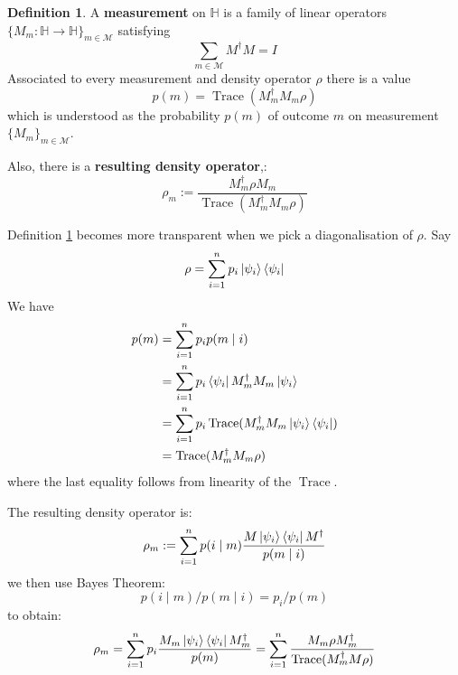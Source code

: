 \documentclass[12pt]{article}
\theoremstyle{plain}
\theoremstyle{definition}
\newtheorem{defn}[thm]{Definition} %
\newcommand{\bb}[1]{\mathbb{#1}}
\newcommand{\call}[1]{\mathcal{#1}}
\newcommand{\lto}{\longrightarrow}
\begin{document}
	\begin{defn}\label{def:density_measurement}
		A \textbf{measurement} on $\bb{H}$ is a family of linear operators $\lbrace M_m: \bb{H} \lto \bb{H}\rbrace_{m \in \call{M}}$ satisfying
		\begin{equation}
			\sum_{m \in \call{M}}M^\dagger M = I
		\end{equation}
		Associated to every measurement and density operator $\rho$ there is a value
		\begin{equation}
			p(m) = \operatorname{Trace}(M^\dagger_mM_m \rho)
		\end{equation}
		which is understood as the probability $p(m)$ of outcome $m$ on measurement $\lbrace M_m\rbrace_{m \in \call{M}}$.
		
		Also, there is a \textbf{resulting density operator},:
		\begin{equation}
			\rho_m := \frac{M_m^\dagger \rho M_m}{\operatorname{Trace}(M^\dagger_mM_m \rho)}
		\end{equation}
	\end{defn}
	Definition \ref{def:density_measurement} becomes more transparent when we pick a diagonalisation of $\rho$. Say
	\begin{equation}
		\rho = \sum_{i = 1}^n p_i \ket{\psi_i}\bra{\psi_i}
		\end{equation}
	We have
	\begin{align*}
		p(m) &= \sum_{i = 1}^n p_i p(m \mid i)\\
		&=\sum_{i = 1}^n p_i \bra{\psi_i}M^\dagger_m M_m \ket{\psi_i}\\
		&= \sum_{i = 1}^n p_i \operatorname{Trace}(M^\dagger_m M_m \ket{\psi_i}\bra{\psi_i})\\
		&= \operatorname{Trace}(M^\dagger_m M_m \rho)
	\end{align*}
	where the last equality follows from linearity of the $\operatorname{Trace}$.
	
	The resulting density operator is:
	\begin{equation}
		\rho_m := \sum_{i = 1}^n p(i\mid m)\frac{M\ket{\psi_i}\bra{\psi_i}M^\dagger}{p(m \mid i)}
	\end{equation}
	we then use Bayes Theorem:
	\begin{equation}
		p(i \mid m)/p(m \mid i) = p_i/p(m)
	\end{equation}
	to obtain:
	\begin{equation}
		\rho_m = \sum_{i = 1}^n p_i\frac{M_m\ket{\psi_i}\bra{\psi_i}M_m^\dagger}{p(m)} = \sum_{i = 1}^n \frac{M_m\rho M_m^\dagger}{\operatorname{Trace}(M^\dagger_m M \rho)}
	\end{equation}
	
\end{document}
